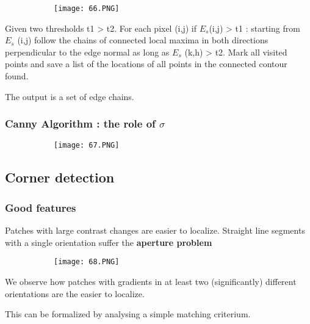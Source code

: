 \documentclass{article}
\begin{document}
\begin{figure}[ht!]
  \centering
  \begin{subfigure}[b]{0.45\linewidth}
    \texttt{[image: 66.PNG]}
  \end{subfigure}
\end{figure}

Given two thresholds t1 > t2.
For each pixel (i,j) if $E_s$(i,j) > t1 : starting from $E_s$ (i,j) follow the chains of connected local maxima in both directions perpendicular to the edge normal as long as $E_s$ (k,h) > t2.
Mark all visited points and save a list of the locations of all points in the connected contour found.

The output is a set of edge chains.

\subsubsection{Canny Algorithm : the role of $\sigma$}

\begin{figure}[ht!]
  \centering
  \begin{subfigure}[b]{0.45\linewidth}
    \texttt{[image: 67.PNG]}
  \end{subfigure}
\end{figure}

\subsection{Corner detection}

\subsubsection{Good features}

Patches with large contrast changes are easier to localize.
Straight line segments with a single orientation suffer the \textbf{aperture problem}


\begin{figure}[ht!]
  \centering
  \begin{subfigure}[b]{0.45\linewidth}
    \texttt{[image: 68.PNG]}
  \end{subfigure}
\end{figure}

We observe how patches with gradients in at least two (significantly) different orientations are the easier to localize.

This can be formalized by analysing a simple matching criterium.
\end{document}
